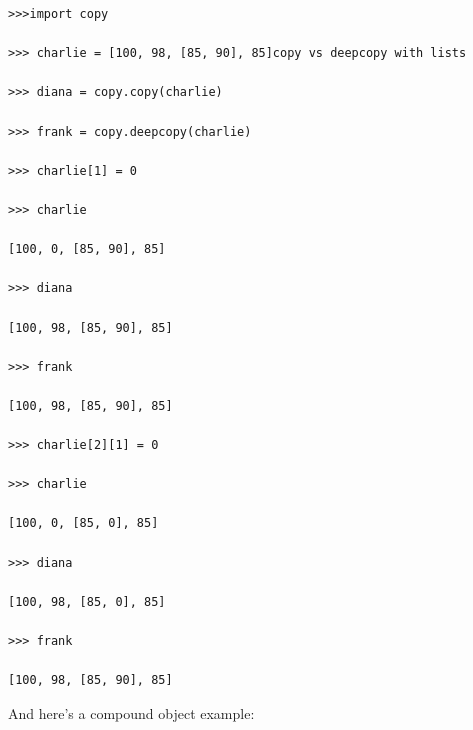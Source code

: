 \documentclass{article}
\begin{document}
\begin{lstlisting}
>>>import copy

>>> charlie = [100, 98, [85, 90], 85]copy vs deepcopy with lists

>>> diana = copy.copy(charlie)

>>> frank = copy.deepcopy(charlie)

>>> charlie[1] = 0

>>> charlie

[100, 0, [85, 90], 85]

>>> diana

[100, 98, [85, 90], 85]

>>> frank

[100, 98, [85, 90], 85]

>>> charlie[2][1] = 0

>>> charlie

[100, 0, [85, 0], 85]

>>> diana

[100, 98, [85, 0], 85]

>>> frank

[100, 98, [85, 90], 85]
\end{lstlisting}

And here's a compound object example:
\end{document}

